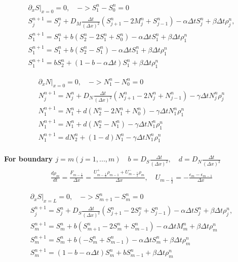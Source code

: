 \documentclass[11pt,twoside]{article}
\numberwithin{equation}{section}
\theoremstyle{plain}
\theoremstyle{nonumberplain}
\begin{document}
 
\begin{eqnarray}
\partial_x S |_{x=0}= 0, \quad -> S^n_1-S^n_0=0\\
S_j^{n+1}=S_j^n+D_M \frac{\Delta t} {(\Delta x)^2}(S^n_{j+1}-2M_j^n+S_{j-1}^n)-\alpha \Delta t S_j^n+\beta \Delta t \rho_j^n, \\
S_1^{n+1}=S_1^n+b(S^n_{2}-2S_1^n+S_{0}^n)-\alpha \Delta t S_1^n+\beta \Delta t \rho_1^n\\
S_1^{n+1}=S_1^n+b(S^n_{2}-S_1^n)-\alpha \Delta t S_1^n+\beta \Delta t \rho_1^n\\
S_1^{n+1}=bS^n_2+(1-b-\alpha \Delta t)S_1^n+\beta \Delta t \rho_1^n
\end{eqnarray}

\begin{eqnarray}
\partial_x N |_{x=0}= 0, \quad -> N^n_1-N^n_0=0\\
N_j^{n+1}=N_j^n+D_N \frac{\Delta t} {(\Delta x)^2}(N^n_{j+1}-2N_j^n+N_{j-1}^n)-\gamma \Delta t N_j^n \rho_j^n\\
N_1^{n+1}=N_1^n+d(N^n_{2}-2N_1^n+N_{0}^n)-\gamma \Delta t N_1^n \rho_1^n\\
N_1^{n+1}=N_1^n+d(N^n_{2}-N_1^n)-\gamma \Delta t N_1^n \rho_1^n\\
N_1^{n+1}=dN^n_{2}+(1-d)N_1^n-\gamma \Delta t N_1^n\rho_1^n\\
\end{eqnarray}


\textbf{ For boundary $ j=m(j=1,...,m) \quad b=D_S \frac{\Delta t} {(\Delta x)^2}, \quad d=D_N \frac{\Delta t} {(\Delta x)^2}$}
\begin{eqnarray}
\frac{d\rho_m}{dt}=\frac{F_{m-\frac{1}{2}}}{\Delta x}=\frac{U^+_{m-\frac{1}{2} }\rho_{m-1}+U^-_{m-\frac{1}{2} }\rho_m }{\Delta x}, \quad U_{m-\frac{1}{2}}=-\frac{\epsilon_m-\epsilon_{m-1}}{\Delta x}
\end{eqnarray}


\begin{eqnarray}
\partial_x S |_{x=L}= 0, \quad -> S^n_{m+1}-S^n_m=0\\
S_j^{n+1}=S_j^n+D_S \frac{\Delta t} {(\Delta x)^2}(S^n_{j+1}-2S_j^n+S_{j-1}^n)-\alpha \Delta t S_j^n+\beta \Delta t \rho_j^n, \\
S_m^{n+1}=S_m^n+b(S^n_{m+1}-2S_m^n+S_{m-1}^n)-\alpha \Delta t M_m^n+\beta \Delta t \rho_m^n\\
S_m^{n+1}=S_m^n+b(-S^n_{m}+S_{m-1}^n)-\alpha \Delta t S_m^n+\beta \Delta t \rho_m^n\\
S_m^{n+1}=(1-b-\alpha \Delta t)S^n_m+bS_{m-1}^n+\beta \Delta t \rho_m^n
\end{eqnarray}
\end{document}
